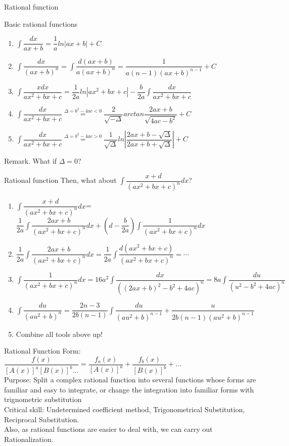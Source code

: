 \begin{frame}{Rational function}
    \begin{block}{Basic rational functions}
        \begin{enumerate}
            \item $\int \dfrac{dx}{ax+b}=\dfrac{1}{a}ln|ax+b|+C$
            \item $\int \dfrac{dx}{(ax+b)^n}=\int\dfrac{d(ax+b)}{a(ax+b)^n}=\dfrac{1}{a(n-1)(ax+b)^{n-1}}+C$
            \item $\int \dfrac{xdx}{ax^2+bx+c}=\dfrac{1}{2a}ln|ax^2+bx+c|-\dfrac{b}{2a}\int\dfrac{dx}{ax^2+bx+c}$
            \item $\int \dfrac{dx}{ax^2+bx+c}\overset{\Delta=b^2-4ac<0}{=}\dfrac{2}{\sqrt{-\Delta}}arctan\dfrac{2ax+b}{\sqrt{4ac-b^2}}+C$
            \item $\int \dfrac{dx}{ax^2+bx+c}\overset{\Delta=b^2-4ac>0}{=}\dfrac{1}{\sqrt{\Delta}}ln|\dfrac{2ax+b-\sqrt{\Delta}}{2ax+b+\sqrt{\Delta}}|+C$
        \end{enumerate}
    \end{block}
    Remark. What if $\Delta=0$?
\end{frame}
\begin{frame}{Rational function}
    Then, what about $\int \dfrac{x+d}{(ax^2+bx+c)^n}dx$?
    \small
    \begin{enumerate}
        \item $\int \dfrac{x+d}{(ax^2+bx+c)^n}dx$=$\dfrac{1}{2a}\int \dfrac{2ax+b}{(ax^2+bx+c)^n}dx+(d-\dfrac{b}{2a})\int\dfrac{1}{(ax^2+bx+c)^n}dx$
        \item $\dfrac{1}{2a}\int \dfrac{2ax+b}{(ax^2+bx+c)^n}dx=\dfrac{1}{2a}\int \dfrac{d(ax^2+bx+c)}{(ax^2+bx+c)^n}=\cdots$
        \item $\int\dfrac{1}{(ax^2+bx+c)^n}dx=16a^2\int\dfrac{dx}{((2ax+b)^2-b^2+4ac)^n}=8a\int\dfrac{du}{(u^2-b^2+4ac)^n}$
        \item $\int\dfrac{du}{(au^2+b)^n}=\dfrac{2n-3}{2b(n-1)}\int\dfrac{du}{(au^2+b)^{n-1}}+\dfrac{u}{2b(n-1)(au^2+b)^{n-1}}$
        \item Combine all tools above up!
    \end{enumerate}
    \normalsize
\end{frame}

\begin{frame}{Rational Function}
    Form: $\dfrac{f(x)}{[A(x)]^{a}[B(x)]^{b}...}=\dfrac{f_{a}(x)}{[A(x)]^{a}}+\dfrac{f_{b}(x)}{[B(x)]^{b}}+...$\\
    \bigskip
    Purpose: Split a complex rational function into several functions whose forms are familiar and easy to integrate, or change the integration into familiar forms with trignometric substitution\\
    \bigskip
    Critical skill: \alert{Undetermined coefficient method, Trigonometrical Substitution, Reciprocal Substitution.}\\
    Also, as rational functions are easier to deal with, we can carry out \alert{Rationalization.}
    \bigskip
\end{frame}


